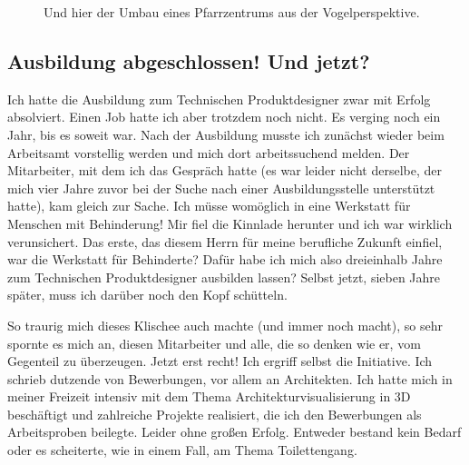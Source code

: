 \documentclass[fontsize=14pt,a4paper,headinclude,DIV=calc,automark]{scrbook}
\begin{document}
\setlength{\fboxsep}{0pt}    %
\setlength{\fboxrule}{0.2pt} %
\begin{figure}[H]
    \raggedright
    \caption{Und hier der Umbau eines Pfarrzentrums aus der Vogelperspektive.}
    \label{fig:pfarrzentrum}
\end{figure}

\subsection{Ausbildung abgeschlossen! Und jetzt?}

Ich hatte die Ausbildung zum Technischen Produktdesigner zwar mit Erfolg absolviert. Einen Job hatte ich aber trotzdem noch nicht. Es verging noch ein Jahr, bis es soweit war. Nach der Ausbildung musste ich zunächst wieder beim Arbeitsamt vorstellig werden und mich dort arbeitssuchend melden. Der Mitarbeiter, mit dem ich das Gespräch hatte (es war leider nicht derselbe, der mich vier Jahre zuvor bei der Suche nach einer Ausbildungsstelle unterstützt hatte), kam gleich zur Sache. Ich müsse womöglich in eine Werkstatt für Menschen mit Behinderung! Mir fiel die Kinnlade herunter und ich war wirklich verunsichert. Das erste, das diesem Herrn für meine berufliche Zukunft einfiel, war die Werkstatt für Behinderte? Dafür habe ich mich also dreieinhalb Jahre zum Technischen Produktdesigner ausbilden lassen? Selbst jetzt, sieben Jahre später, muss ich darüber noch den Kopf schütteln.

So traurig mich dieses Klischee auch machte (und immer noch macht), so sehr spornte es mich an, diesen Mitarbeiter und alle, die so denken wie er, vom Gegenteil zu überzeugen. Jetzt erst recht! Ich ergriff selbst die Initiative. Ich schrieb dutzende von Bewerbungen, vor allem an Architekten. Ich hatte mich in meiner Freizeit intensiv mit dem Thema Architekturvisualisierung in 3D beschäftigt und zahlreiche Projekte realisiert, die ich den Bewerbungen als Arbeitsproben beilegte. Leider ohne großen Erfolg. Entweder bestand kein Bedarf oder es scheiterte, wie in einem Fall, am Thema Toilettengang.
\end{document}

